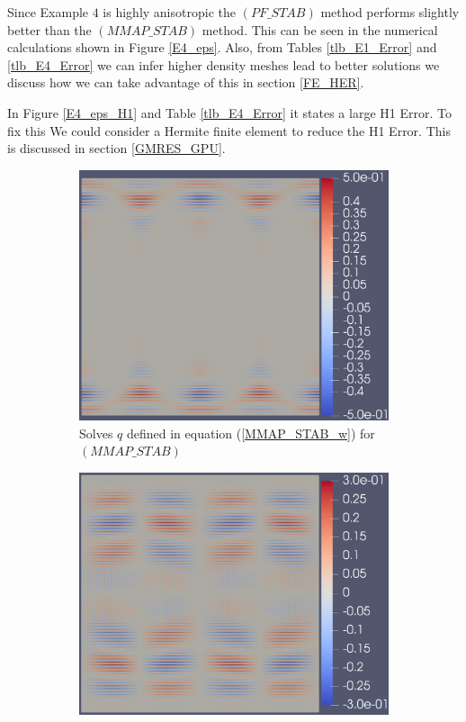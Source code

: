 \documentclass[12pt]{ociamthesis}
\begin{document}
Since Example $4$ is highly anisotropic the $(PF\_STAB)$ method performs slightly better than the $(MMAP\_STAB)$ method. This can be seen in the numerical calculations shown in Figure \ref{E4_eps}. Also, from Tables \ref{tlb_E1_Error} and \ref{tlb_E4_Error} we can infer higher density meshes lead to better solutions we discuss how we can take advantage of this in section \ref{FE_HER}.

In Figure \ref{E4_eps_H1} and Table \ref{tlb_E4_Error} it states a large H1 Error. To fix this We could consider a Hermite finite element to reduce the H1 Error. This is discussed in section \ref{GMRES_GPU}.

\begin{figure}[H]
 \begin{subfigure}{0.5\textwidth}
     \includegraphics[width=\textwidth]{Pics/ErrorPlots/E4_MMAP_STAB_Q.png}
     \caption{Solves $q$ defined in equation (\ref{MMAP_STAB_w}) for $(MMAP\_STAB)$}
 \end{subfigure}
   \begin{subfigure}{0.5\textwidth}
     \includegraphics[width=\textwidth]{Pics/ErrorPlots/E4_PF_STAB_Q.png}

\end{subfigure}
\end{figure}
\end{document}

